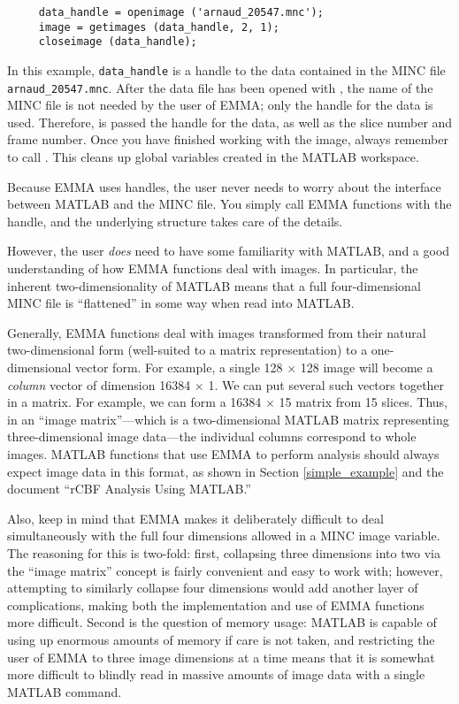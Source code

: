 %
\begin{verbatim}
     data_handle = openimage ('arnaud_20547.mnc');
     image = getimages (data_handle, 2, 1); 
     closeimage (data_handle);
\end{verbatim}
%

In this example, \verb+data_handle+ is a handle to the data contained
in the MINC file \verb+arnaud_20547.mnc+.  After the data file has
been opened with , the name of the MINC file is not
needed by the user of EMMA; only the handle for the data is used.
Therefore,  is passed the handle for the data, as well
as the slice number and frame number.  Once you have finished working
with the image, always remember to call .  This
cleans up global variables created in the MATLAB workspace.

Because EMMA uses handles, the user never needs to worry about the
interface between MATLAB and the MINC file.  You simply call EMMA
functions with the handle, and the underlying structure takes care of
the details.

However, the user {\em does} need to have some familiarity with
MATLAB, and a good understanding of how EMMA functions deal with
images.  In particular, the inherent two-dimensionality of MATLAB
means that a full four-dimensional MINC file is ``flattened'' in some
way when read into MATLAB.

Generally, EMMA functions deal with images transformed from their
natural two-dimensional form (well-suited to a matrix representation)
to a one-dimensional vector form.  For example, a single 128 $\times$
128 image will become a {\em column} vector of dimension 16384
$\times$ 1.  We can put several such vectors together in a matrix.
For example, we can form a 16384 $\times$ 15 matrix from 15 slices.
Thus, in an ``image matrix''---which is a two-dimensional MATLAB
matrix representing three-dimensional image data---the individual
columns correspond to whole images.  MATLAB functions that use EMMA to
perform analysis should always expect image data in this format, as
shown in Section
\ref{simple_example} and the document ``rCBF Analysis Using MATLAB.''

Also, keep in mind that EMMA makes it deliberately difficult to deal
simultaneously with the full four dimensions allowed in a MINC image
variable.  The reasoning for this is two-fold: first, collapsing three
dimensions into two via the ``image matrix'' concept is fairly
convenient and easy to work with; however, attempting to similarly
collapse four dimensions would add another layer of complications,
making both the implementation and use of EMMA functions more
difficult.  Second is the question of memory usage: MATLAB is capable
of using up enormous amounts of memory if care is not taken, and
restricting the user of EMMA to three image dimensions at a time means
that it is somewhat more difficult to blindly read in massive amounts
of image data with a single MATLAB command.

